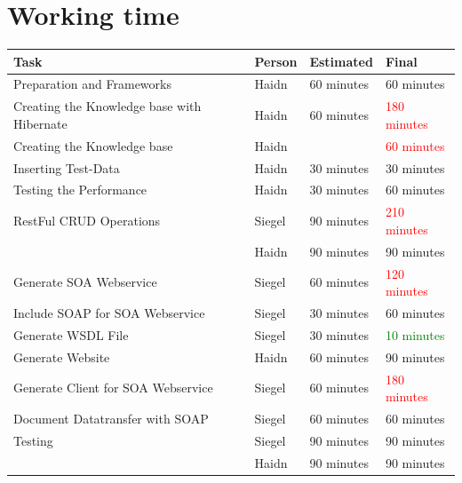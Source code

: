 \documentclass[12pt]{article}
\begin{document}
\section{Working time}
\begin{center}
\end{center}
\begin{table}[h]
\begin{tabular}{|p{}|p{}|p{}|p{}|}
\hline
\textbf{Task}    & \textbf{Person}   & \textbf{Estimated}  & \textbf{Final}\\ \hline \hline

Preparation and Frameworks & Haidn &  60 minutes & 60 minutes  \\ \hline 


Creating the Knowledge base with Hibernate & Haidn &  60   minutes & \textcolor{red}{180 minutes}
   \\ \hline 
Creating the Knowledge base & Haidn &  &  \textcolor{red}{60 minutes} \\ \hline 

Inserting Test-Data  & Haidn &  30 minutes  &  30 minutes  \\ \hline 

Testing the Performance  & Haidn &  30  minutes  &  60  minutes  \\ \hline 

RestFul CRUD Operations & Siegel &  90   minutes & \textcolor{red}{210 minutes} \\  
  & Haidn &  90 minutes  &  90   minutes  \\ \hline 


Generate SOA Webservice & Siegel &  60 minutes &  \textcolor{red}{120 minutes} \\ \hline 

Include SOAP for SOA Webservice & Siegel &  30 minutes &  60 minutes \\ \hline 
Generate WSDL File & Siegel &  30 minutes & \textcolor{green}{10 minutes}  \\ \hline 

Generate Website & Haidn &  60 minutes &  90 minutes \\ \hline 

Generate Client for SOA Webservice & Siegel &  60 minutes & \textcolor{red}{180 minutes} \\ \hline 
Document Datatransfer with SOAP & Siegel &  60 minutes &  60 minutes \\ \hline 

Testing & Siegel &  90  minutes  &  90  minutes  \\  
  & Haidn &  90  minutes  &  90  minutes   \\ \hline 



\end{tabular}
\end{table}
\end{document}
